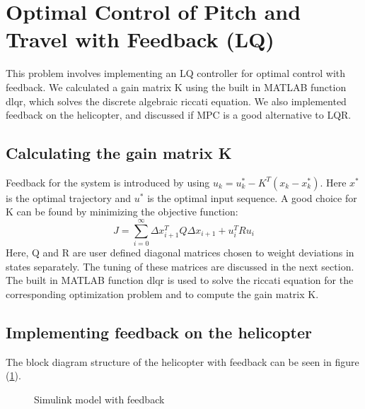 \section{Optimal Control of Pitch and Travel with Feedback (LQ)}\label{sec:prob3}
This problem involves implementing an LQ controller for optimal control with feedback. We calculated a gain matrix K using the built in MATLAB function dlqr, which solves the  discrete algebraic riccati equation. We also implemented feedback on the helicopter, and discussed if MPC is a good alternative to LQR.

\subsection{Calculating the gain matrix K}
Feedback for the system is introduced by using $u_k=u_k^*-K^T(x_k-x_k^*)$. Here $x^*$ is the optimal trajectory and $u^*$ is the optimal input sequence. A good choice for K can be found by minimizing the objective function:
\begin{equation}
J = \sum_{i=0}^\infty {\Delta x_{i+1}^TQ\Delta x_{i+1} + u_{i}^TRu_{i}}
\end{equation}
Here, Q and R are user defined diagonal matrices chosen to weight deviations in states separately. The tuning of these matrices are discussed in the next section. The built in MATLAB function dlqr is used to solve the riccati equation for the corresponding optimization problem and to compute the gain matrix K. 

\subsection{Implementing feedback on the helicopter}
The block diagram structure of the helicopter with feedback can be seen in figure (\ref{fig:day3_mdl}).
\begin{figure}[htb]
	\centering
	\caption{Simulink model with feedback}
	\label{fig:day3_mdl}
\end{figure}

